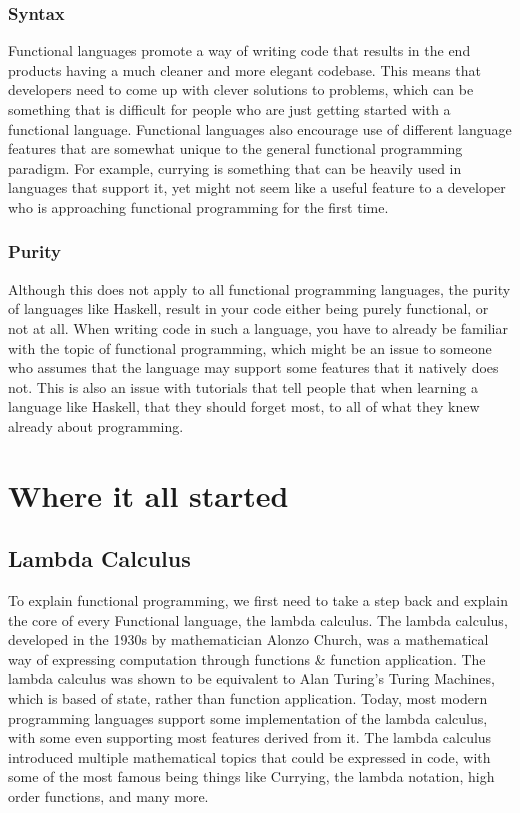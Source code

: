 \documentclass{report}
\begin{document}
\subsubsection{Syntax}
Functional languages promote a way of writing code that results in the end products having a much cleaner and more elegant codebase. This means that developers need to come up with clever solutions to problems, which can be something that is difficult for people who are just getting started with a functional language. Functional languages also encourage use of different language features that are somewhat unique to the general functional programming paradigm. For example, currying is something that can be heavily used in languages that support it, yet might not seem like a useful feature to a developer who is approaching functional programming for the first time.
\subsubsection{Purity}
Although this does not apply to all functional programming languages, the purity of languages like Haskell, result in your code either being purely functional, or not at all. When writing code in such a language, you have to already be familiar with the topic of functional programming, which might be an issue to someone who assumes that the language may support some features that it natively does not. This is also an issue with tutorials that tell people that when learning a language like Haskell, that they should forget most, to all of what they knew already about programming.
\section{Where it all started}
\subsection{Lambda Calculus}
To explain functional programming, we first need to take a step back and explain the core of every Functional language, the lambda calculus. The lambda calculus, developed in the 1930s by mathematician Alonzo Church, was a mathematical way of expressing computation through functions \& function application. The lambda calculus was shown to be equivalent to Alan Turing's Turing Machines, which is based of state, rather than function application.
Today, most modern programming languages support some implementation of the lambda calculus, with some even supporting most features derived from it.
The lambda calculus introduced multiple mathematical topics that could be expressed in code, with some of the most famous being things like Currying, the lambda notation, high order functions, and many more.
\end{document}
